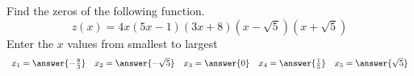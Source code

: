 \documentclass{ximera}
\author{David Kish}
\begin{document}
\begin{exercise}
Find the zeros of the following function.
\[
z(x)=4x(5x-1)(3x+8)(x-\sqrt{5})(x+\sqrt{5})
\]
Enter the $x$ values from smallest to largest
\[
\begin{array}{ccccc}
x_1 = \answer{-\frac{8}{3}} & x_2  = \answer{-\sqrt{5}} & x_3 = \answer{0} & x_4  = \answer{\frac{1}{5}} & x_5 = \answer{\sqrt{5}}
\end{array}
\]

\end{exercise}
\end{document}
